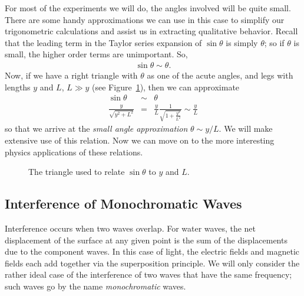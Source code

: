 For most of the experiments we will do, the angles involved will be quite 
small. There are some handy approximations we can use in this case to simplify
our trigonometric calculations and assist us in extracting qualitative 
behavior. Recall that the leading term in the Taylor series expansion of 
$\sin \theta$ is simply $\theta$; so if $\theta$ is small, the higher order 
terms are unimportant. So,
\begin{eqnarray*}
\sin \theta \sim \theta.
\end{eqnarray*}
Now, if we have a right triangle with $\theta$ as one of the acute angles, and
legs with lengths $y$ and $L$, $L \gg y$ (see Figure~\ref{fig:diff:triangle}), 
then we can approximate
\begin{eqnarray*}
\sin \theta &\sim& \theta \\
\frac{y}{\sqrt{y^2+L^2}} &=& \frac{y}{L}
\frac{1}{\sqrt{1+\frac{y^2}{L^2}}}
\sim \frac{y}{L}
\end{eqnarray*}
so that we arrive at the {\em small angle approximation} $\theta \sim y/L$. We
will make extensive use of this relation.
Now we can move on to the more interesting physics applications of these 
relations.
\begin{figure}[htb]
\centerline{\epsfxsize=6cm }
\caption{The triangle used to relate $\sin\theta$ to $y$ and $L$.} 
\label{fig:diff:triangle}
\end{figure}

\subsection{Interference of Monochromatic Waves}

Interference occurs when two waves overlap. For water waves, the net 
displacement of the surface at any given point is the sum of the displacements
due to the component waves. In this case of light, the electric fields and 
magnetic fields each add together via the superposition principle. 
We will only consider the rather ideal case of the interference of two waves 
that have the same frequency; such waves go by the name {\em monochromatic} 
waves.

